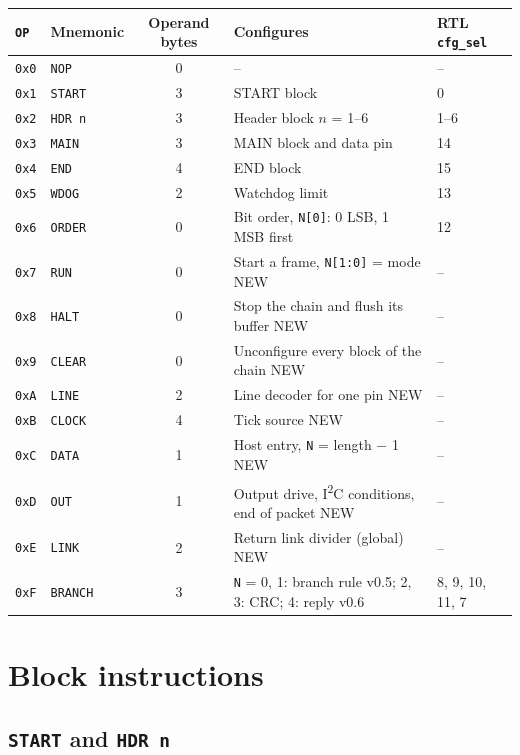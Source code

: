 \documentclass[11pt,a4paper]{article}
\newcommand{\new}{\textcolor{newc}{\textsf{\small NEW}}}
\newcommand{\vfive}{\textcolor{fivec}{\textsf{\small v0.5}}}
\newcommand{\vsix}{\textcolor{sixc}{\textsf{\small v0.6}}}
\newcommand{\sig}[1]{\texttt{#1}}
\begin{document}
\begin{center}\small
\begin{tabular}{@{}llcll@{}}
\toprule
\sig{OP} & Mnemonic & Operand bytes & Configures & RTL \sig{cfg\_sel} \\
\midrule
\texttt{0x0} & \sig{NOP}   & 0 & -- & -- \\
\texttt{0x1} & \sig{START} & 3 & START block & 0 \\
\texttt{0x2} & \sig{HDR n} & 3 & Header block $n$ = 1--6 & 1--6 \\
\texttt{0x3} & \sig{MAIN}  & 3 & MAIN block and data pin & 14 \\
\texttt{0x4} & \sig{END}   & 4 & END block & 15 \\
\texttt{0x5} & \sig{WDOG}  & 2 & Watchdog limit & 13 \\
\texttt{0x6} & \sig{ORDER} & 0 & Bit order, \sig{N[0]}: 0 LSB, 1 MSB first & 12 \\
\texttt{0x7} & \sig{RUN}   & 0 & Start a frame, \sig{N[1:0]} = mode \new & -- \\
\texttt{0x8} & \sig{HALT}  & 0 & Stop the chain and flush its buffer \new & -- \\
\texttt{0x9} & \sig{CLEAR} & 0 & Unconfigure every block of the chain \new & -- \\
\texttt{0xA} & \sig{LINE}  & 2 & Line decoder for one pin \new & -- \\
\texttt{0xB} & \sig{CLOCK} & 4 & Tick source \new & -- \\
\texttt{0xC} & \sig{DATA}  & 1 & Host entry, \sig{N} = length $-$ 1 \new & -- \\
\texttt{0xD} & \sig{OUT}   & 1 & Output drive, I\textsuperscript{2}C conditions, end of packet \new & -- \\
\texttt{0xE} & \sig{LINK}  & 2 & Return link divider (global) \new & -- \\
\texttt{0xF} & \sig{BRANCH} & 3 & \sig{N} = 0, 1: branch rule \vfive; 2, 3: CRC; 4: reply \vsix & 8, 9, 10, 11, 7 \\
\bottomrule
\end{tabular}
\end{center}

\section{Block instructions}

\subsection{\sig{START} and \sig{HDR n}}
\end{document}
